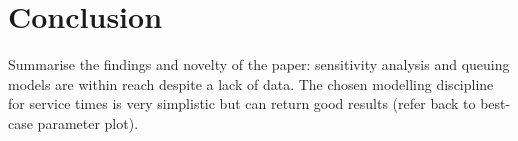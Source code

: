 \section{Conclusion}\label{sec:conclusion}

Summarise the findings and novelty of the paper: sensitivity analysis and
queuing models are within reach despite a lack of data. The chosen modelling
discipline for service times is very simplistic but can return good results
(refer back to best-case parameter plot).
